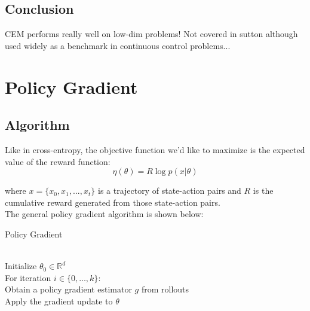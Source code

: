 \documentclass[11pt]{article}
\theoremstyle{plain}
\theoremstyle{definition}
\begin{document}
\begin{comment}
MM monotically increases expected reward! How??

Theorem: CEM converges to a local maximum of the objective $N(\theta) = E(f(\theta))$
Theorem: CEM does not converge to a local maximum of the objective $N(\theta) = E_{\zeta}(f(\theta,\zeta))$
\end{comment}

\subsection{Conclusion}

CEM performs really well on low-dim problems!
Not covered in sutton although used widely as a benchmark in continuous control problems...

\section{Policy Gradient}

\subsection{Algorithm}

Like in cross-entropy, the objective function we'd like to maximize is the expected value of the reward function:
\begin{equation}
  \eta(\theta) = R \log p(x|\theta)
\end{equation}

where $x = \{x_0, x_1, ..., x_t\}$ is a trajectory of state-action pairs and $R$ is the cumulative reward generated from those state-action pairs.
\\

The general policy gradient algorithm is shown below:
\begin{algorithm}
\caption{Policy Gradient}
\begin{algorithmic}
\\Initialize $\theta_0 \in \mathbb{R}^d$
\\For iteration $i \in \{0,\ldots,k\}$:
\\ \hspace*{4} Obtain a policy gradient estimator $g$ from rollouts
\\ \hspace*{4} Apply the gradient update to $\theta$
\end{algorithmic}
\end{algorithm}
\end{document}
